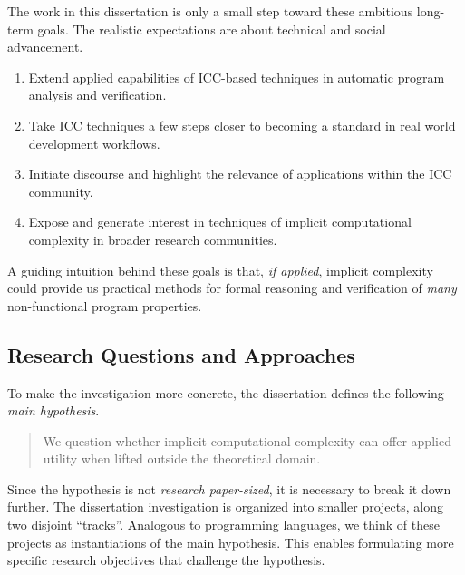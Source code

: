 The work in this dissertation is only a small step toward these ambitious long-term goals.
The realistic expectations are about technical and social advancement.
\begin{enumerate}
\item Extend {applied} capabilities of ICC-based techniques in automatic program analysis and verification.
\item Take ICC techniques a few steps closer to becoming a standard in real world development workflows.
\item Initiate discourse and highlight the relevance of applications within the ICC community.
\item Expose and generate interest in techniques of implicit computational complexity in broader research communities.
\end{enumerate}
A guiding intuition behind these goals is that, \emph{if applied}, implicit complexity could provide us practical methods for formal reasoning and verification of \emph{many} non-functional program properties.

\subsection{Research Questions and Approaches}

To make the investigation more concrete, the dissertation defines the following \emph{main hypothesis}.
\begin{quotation}
\noindent We question whether implicit computational complexity can offer applied utility when lifted outside the theoretical domain.
\end{quotation}
Since the hypothesis is not \emph{research paper-sized}, it is necessary to break it down further.
The dissertation investigation is organized into smaller projects, along two disjoint \enquote{tracks}.
Analogous to programming languages, we think of these projects as instantiations of the main hypothesis.
This enables formulating more specific research objectives that challenge the hypothesis.

